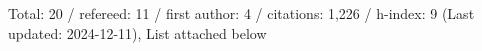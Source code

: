 Total: 20 / refereed: 11 / first author: 4 / citations: 1,226 / h-index: 9 (Last updated: 2024-12-11), List attached below